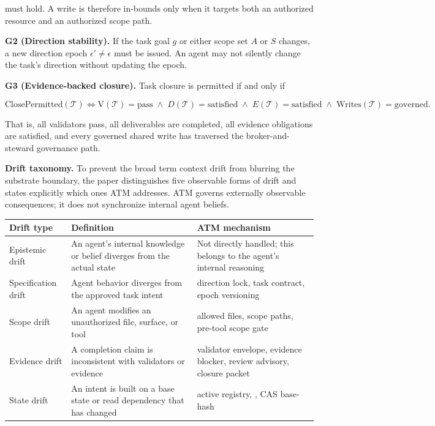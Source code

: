 \documentclass[9pt,letterpaper]{extarticle}
\newcommand{\TableLargeFont}{\fontsize{8.8}{10.0}\selectfont}
\newcommand{\TableLead}[1]{\par\smallskip\noindent{\raggedright\small\bfseries #1\par}\smallskip}
\begin{document}
must hold. A write is therefore in-bounds only when it targets both an authorized resource and an authorized scope path.

\textbf{G2 (Direction stability).} If the task goal $g$ or either scope set $A$ or $S$ changes, a new direction epoch $\epsilon' \neq \epsilon$ must be issued. An agent may not silently change the task's direction without updating the epoch.

\textbf{G3 (Evidence-backed closure).} Task closure is permitted if and only if

\[
\text{ClosePermitted}(\mathcal{T}) \iff
\text{V}(\mathcal{T}) = \text{pass}
\;\land\;
D(\mathcal{T}) = \text{satisfied}
\;\land\;
E(\mathcal{T}) = \text{satisfied}
\;\land\;
\text{Writes}(\mathcal{T}) = \text{governed}.
\]

That is, all validators pass, all deliverables are completed, all evidence obligations are satisfied, and every governed shared write has traversed the broker-and-steward governance path.

\textbf{Drift taxonomy.} To prevent the broad term {}context drift{} from blurring the substrate boundary, the paper distinguishes five observable forms of drift and states explicitly which ones ATM addresses. ATM governs externally observable consequences; it does not synchronize internal agent beliefs.

\TableLead{Table 2 --- Drift Taxonomy Summary.}

\begingroup
\TableLargeFont
\setlength{\tabcolsep}{3pt}
\begin{longtable}{@{}L{0.22\textwidth}L{0.25\textwidth}L{0.47\textwidth}@{}}
\toprule
Drift type & Definition & ATM mechanism \\
\midrule
Epistemic drift & An agent's internal knowledge or belief diverges from the actual state & Not directly handled; this belongs to the agent's internal reasoning \\
Specification drift & Agent behavior diverges from the approved task intent & direction lock, task contract, epoch versioning \\
Scope drift & An agent modifies an unauthorized file, surface, or tool & allowed files, scope paths, pre-tool scope gate \\
Evidence drift & A completion claim is inconsistent with validators or evidence & validator envelope, evidence blocker, review advisory, closure packet \\
State drift & An intent is built on a base state or read dependency that has changed & active registry, \texttt{}, CAS base-hash \\
\bottomrule
\end{longtable}
\endgroup
\end{document}

